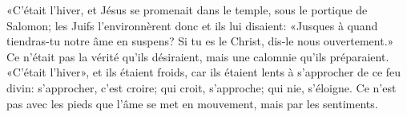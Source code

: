 «C’était l’hiver, et Jésus se promenait dans le temple, sous le portique de Salomon;
	les Juifs l’environnèrent donc et ils lui disaient:
	«Jusques à quand tiendras-tu notre âme en suspens?
Si tu es le Christ, dis-le nous ouvertement.»
Ce n’était pas la vérité qu’ils désiraient,
	mais une calomnie qu’ils préparaient.
«C’était l’hiver», et ils étaient froids,
	car ils étaient lents à s’approcher de ce feu divin:
	s’approcher, c’est croire;
	qui croit, s’approche; qui nie, s’éloigne.
Ce n’est pas avec les pieds que l’âme se met en mouvement, mais par les sentiments.
